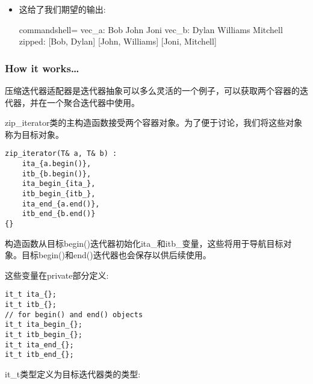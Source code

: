 \begin{itemize}
\begin{lstlisting}[style=styleCXX]
int main()
{
	vector<std::string> vec_a {"Bob", "John", "Joni"};
	vector<std::string> vec_b {"Dylan", "Williams",
		"Mitchell"};
	
	cout << "vec_a: ";
	for(auto e : vec_a) cout << format("{} ", e);
	cout << '\n';
	
	cout << "vec_b: ";
	for(auto e : vec_b) cout << format("{} ", e);
	cout << '\n';
	
	cout << "zipped: ";
	for(auto [a, b] : zip_iterator(vec_a, vec_b)) {
		cout << format("[{}, {}] ", a, b);
	}
	cout << '\n';
}
\end{lstlisting}


\item 
这给了我们期望的输出:

\begin{tcblisting}{commandshell={}}
vec_a: Bob John Joni
vec_b: Dylan Williams Mitchell
zipped: [Bob, Dylan] [John, Williams] [Joni, Mitchell]
\end{tcblisting}

\end{itemize}

\subsubsection{How it works…}

压缩迭代器适配器是迭代器抽象可以多么灵活的一个例子，可以获取两个容器的迭代器，并在一个聚合迭代器中使用。

zip\_iterator类的主构造函数接受两个容器对象。为了便于讨论，我们将这些对象称为目标对象。

\begin{lstlisting}[style=styleCXX]
zip_iterator(T& a, T& b) :
	ita_{a.begin()},
	itb_{b.begin()},
	ita_begin_{ita_},
	itb_begin_{itb_},
	ita_end_{a.end()},
	itb_end_{b.end()}
{}
\end{lstlisting}

构造函数从目标begin()迭代器初始化ita\_和itb\_变量，这些将用于导航目标对象。目标begin()和end()迭代器也会保存以供后续使用。

这些变量在private部分定义:

\begin{lstlisting}[style=styleCXX]
it_t ita_{};
it_t itb_{};
// for begin() and end() objects
it_t ita_begin_{};
it_t itb_begin_{};
it_t ita_end_{};
it_t itb_end_{};
\end{lstlisting}

it\_t类型定义为目标迭代器类的类型:

